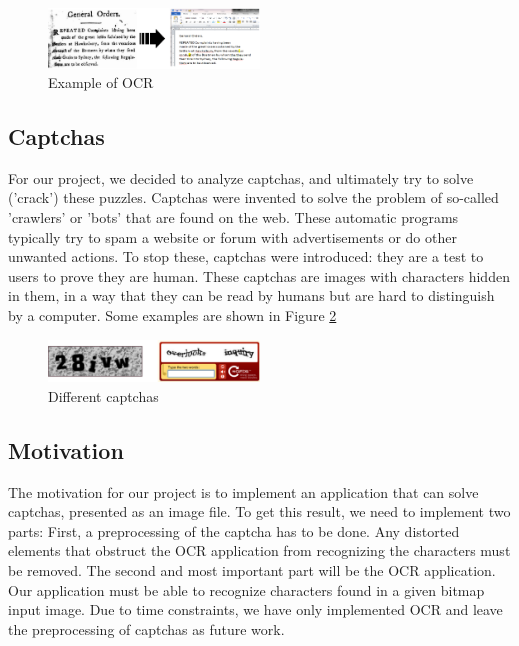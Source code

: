 \documentclass{article}
\begin{document}
\begin{figure} [H]
	\centering
	\includegraphics[width=0.5\textwidth]{images/OCRex.PNG}
	\caption{Example of OCR}\label{fig:OCRex}
\end{figure}

\subsection{Captchas}
For our project, we decided to analyze captchas, and ultimately try to solve ('crack') these puzzles. Captchas were invented to solve the problem of so-called 'crawlers' or 'bots' that are found on the web. These automatic programs typically try to spam a website or forum with advertisements or do other unwanted actions. To stop these, captchas were introduced: they are a test to users to prove they are human. These captchas are images with characters hidden in them, in a way that they can be read by humans but are hard to distinguish by a computer. Some examples are shown in Figure \ref{fig:captchas}

\begin{figure}[H]
	\centering
	\includegraphics[width=0.5\textwidth]{images/captchas.PNG}
	\caption{Different captchas}\label{fig:captchas}
\end{figure}
 
\subsection{Motivation}
The motivation for our project is to implement an application that can solve captchas, presented as an image file. To get this result, we need to implement two parts: First, a preprocessing of the captcha has to be done. Any distorted elements that obstruct the OCR application from recognizing the characters must be removed. The second and most important part will be the OCR application. Our application must be able to recognize characters found in a given bitmap input image. Due to time constraints, we have only implemented OCR and leave the preprocessing of captchas as future work.
\end{document}
